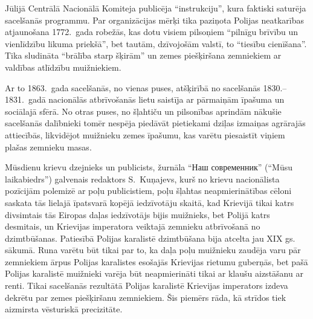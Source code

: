 \documentclass[twoside,a5paper,12pt,fleqn,openany]{extbook}
\newcommand{\rutxti}[1]{\textrussian{#1}}
\begin{document}
Jūlijā Centrālā Nacionālā Komiteja publicēja ``instrukciju'', kura faktiski saturēja sacelšanās programmu. Par organizācijas mērķi tika paziņota Polijas neatkarības atjaunošana 1772.~gada robežās, kas dotu visiem pilsoņiem ``pilnīgu brīvību un vienlīdzību likuma priekšā'', bet tautām, dzīvojošām valstī, to ``tiesību cienīšana''. Tika sludināta ``brālība starp šķirām'' un zemes piešķiršana zemniekiem ar valdības atlīdzību muižniekiem.

Ar to 1863.~gada sacelšanās, no vienas puses, atšķirībā no sacelšanās 1830.--1831.~gadā nacionālās atbrīvošanās lietu saistīja ar pārmaiņām īpašuma un sociālajā sfērā. No otras puses, no šļahtiču un pilsonības aprindām nākušie sacelšanās dalībnieki tomēr nespēja piedāvāt pietiekami dziļas izmaiņas agrārajās attiecībās, likvidējot muižnieku zemes īpašumu, kas varētu piesaistīt viņiem plašas zemnieku masas.

Mūsdienu krievu dzejnieks un publicists, žurnāla ``\rutxti{Наш современник}'' (``Mūsu laikabiedrs'') galvenais redaktors S.~Kuņajevs, kurš no krievu nacionālista pozīcijām polemizē ar poļu publicistiem, poļu šļahtas neapmierinātības cēloni saskata tās lielajā īpatsvarā kopējā iedzīvotāju skaitā, kad Krievijā tikai katrs divsimtais tās Eiropas daļas iedzīvotājs bijis muižnieks, bet Polijā katrs desmitais, un Krievijas imperatora veiktajā zemnieku atbrīvošanā no dzimtbūšanas. Patiesībā Polijas karalistē dzimtbūšana bija atcelta jau XIX gs. sākumā. Runa varētu būt tikai par to, ka daļa poļu muižnieku zaudēja varu pār zemniekiem ārpus Polijas karalistes esošajās Krievijas rietumu guberņās, bet pašā Polijas karalistē muižnieki varēja būt neapmierināti tikai ar klaušu aizstāšanu ar renti. Tikai sacelšanās rezultātā Polijas karalistē Krievijas imperators izdeva dekrētu par zemes piešķiršanu zemniekiem. Šis piemērs rāda, kā strīdos tiek aizmirsta vēsturiskā precizitāte.
\end{document}
